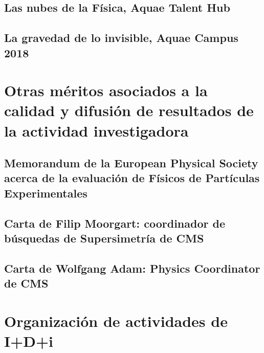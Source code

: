 \documentclass[a4paper, 11pt, twoside, openright]{report}
\begin{document}
\subsection{Las nubes de la Física, Aquae Talent Hub}


\subsection{La gravedad de lo invisible, Aquae Campus 2018} 




\section{Otras méritos asociados a la calidad y difusión de resultados de la actividad investigadora}
\subsection{Memorandum de la European Physical Society acerca de la evaluación de Físicos de Partículas Experimentales}

\subsection{Carta de Filip Moorgart: coordinador de búsquedas de Supersimetría de CMS}

\subsection{Carta de Wolfgang Adam: Physics Coordinator de CMS}




\section{Organización de actividades de I+D+i}
\end{document}
